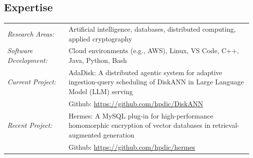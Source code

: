 \documentclass[11pt,]{scrartcl}
\newcommand{\arygap}{.9}
\begin{document}




\subsection{Expertise}\label{services}
\begin{table}[!h]
{\def\arraystretch{\arygap}\tabcolsep=0pt
\begin{tabular}{p{0.25\linewidth}p{0.77\linewidth}}

    \textit{Research Areas:} & Artificial intelligence, databases, distributed computing, applied cryptography\\
  
  \textit{Software Development:} & Cloud environments (e.g., AWS), Linux, VS Code, C++, Java, Python, Bash\\
  
  \textit{Current Project:} & AdaDisk: A distributed agentic system for adaptive ingestion-query scheduling of DiskANN in Large Language Model (LLM) serving\\
  & Github: \url{https://github.com/hpdic/DiskANN}\\

  \textit{Recent Project:} & Hermes: A MySQL plug-in for high-performance homomorphic encryption of vector databases in retrieval-augmented generation\\
  & Github: \url{https://github.com/hpdic/hermes}\\







\end{tabular}%
}
\end{table}
\end{document}
